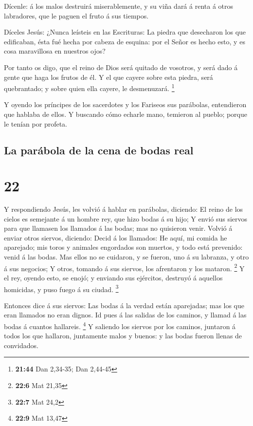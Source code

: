  Dícenle: á los malos destruirá miserablemente, y su viña
dará á renta á otros labradores, que le paguen el fruto á sus tiempos.

 Díceles Jesús: ¿Nunca leísteis en las Escrituras: La
piedra que desecharon los que edificaban, ésta fué hecha por cabeza de
esquina: por el Señor es hecho esto, y es cosa maravillosa en nuestros
ojos?

 Por tanto os digo, que el reino de Dios será quitado de
vosotros, y será dado á gente que haga los frutos de él.  Y
el que cayere sobre esta piedra, será quebrantado; y sobre quien ella
cayere, le desmenuzará. \footnote{\textbf{21:44} Dan 2,34-35; Dan
  2,44-45}

 Y oyendo los príncipes de los sacerdotes y los Fariseos
sus parábolas, entendieron que hablaba de ellos.  Y
buscando cómo echarle mano, temieron al pueblo; porque le tenían por
profeta.

\hypertarget{la-paruxe1bola-de-la-cena-de-bodas-real}{%
\subsection{La parábola de la cena de bodas
real}\label{la-paruxe1bola-de-la-cena-de-bodas-real}}

\hypertarget{section-21}{%
\section{22}\label{section-21}}

 Y respondiendo Jesús, les volvió á hablar en parábolas,
diciendo:  El reino de los cielos es semejante á un hombre
rey, que hizo bodas á su hijo;  Y envió sus siervos para que
llamasen los llamados á las bodas; mas no quisieron venir. 
Volvió á enviar otros siervos, diciendo: Decid á los llamados: He aquí,
mi comida he aparejado; mis toros y animales engordados son muertos, y
todo está prevenido: venid á las bodas.  Mas ellos no se
cuidaron, y se fueron, uno á su labranza, y otro á sus negocios;
 Y otros, tomando á sus siervos, los afrentaron y los
mataron. \footnote{\textbf{22:6} Mat 21,35}  Y el rey,
oyendo esto, se enojó; y enviando sus ejércitos, destruyó á aquellos
homicidas, y puso fuego á su ciudad. \footnote{\textbf{22:7} Mat 24,2}

 Entonces dice á sus siervos: Las bodas á la verdad están
aparejadas; mas los que eran llamados no eran dignos.  Id
pues á las salidas de los caminos, y llamad á las bodas á cuantos
hallareis. \footnote{\textbf{22:9} Mat 13,47}  Y saliendo
los siervos por los caminos, juntaron á todos los que hallaron,
juntamente malos y buenos: y las bodas fueron llenas de convidados.

